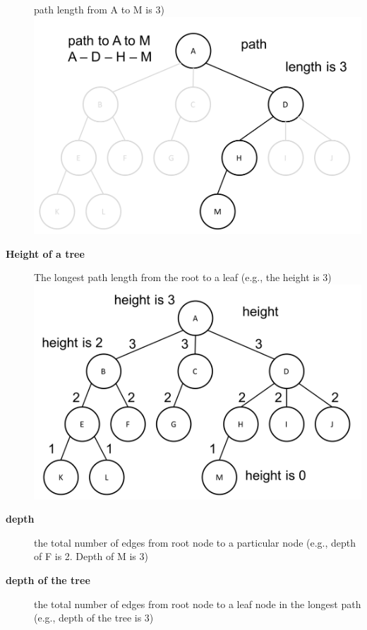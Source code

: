 \documentclass[newPxFont,sthlmFooter,nooffset]{beamer}
\begin{document}
\begin{frame}[t, allowframebreaks]
\begin{description}
    path length from A to M is 3)\\
\includegraphics[height=0.3\textheight]{./figures/fig02_def_path.png}
  \item[\textbf{Height of a tree}] The longest path length from the
    root to a leaf (e.g., the height is 3)\\
\includegraphics[height=0.3\textheight]{./figures/fig02_def_height.png}
\newpage  \item[\textbf{depth}] the total number of edges from root node to a
    particular node (e.g., depth of F is 2. Depth of M is 3)
  \item[\textbf{depth of the tree}] the total number of edges from
    root node to a leaf node in the longest path (e.g., depth of the
    tree is 3)\\

\end{description}
\end{frame}
\end{document}
